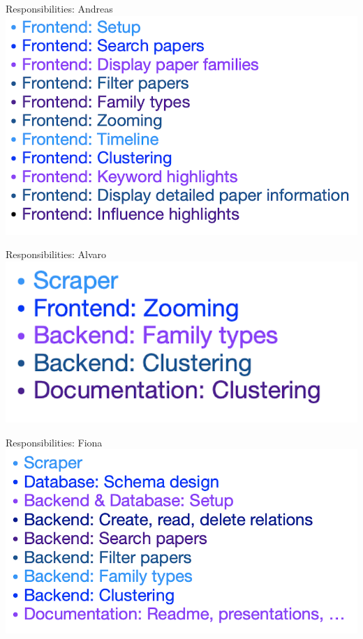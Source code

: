 \documentclass{beamer}
\begin{document}
\begin{frame}{Responsibilities: Andreas}
    \includegraphics{img_22.png}
\end{frame}

\begin{frame}{Responsibilities: Alvaro}
    \includegraphics{img_23.png}
\end{frame}

\begin{frame}{Responsibilities: Fiona}
    \includegraphics{img_24.png}
\end{frame}
\end{document}
